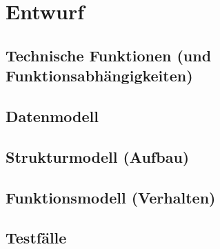\section{Entwurf}

\subsection{Technische Funktionen (und Funktionsabhängigkeiten)}

\subsection{Datenmodell}

\subsection{Strukturmodell (Aufbau)}

\subsection{Funktionsmodell (Verhalten)}

\subsection{Testfälle}
